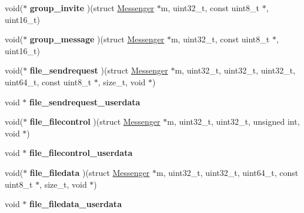 \begin{DoxyCompactItemize}
\item 
\hypertarget{struct_messenger_a60eaca4be38363ad7bc9d454fee814f4}{void($\ast$ {\bfseries group\+\_\+invite} )(struct \hyperlink{struct_messenger}{Messenger} $\ast$m, uint32\+\_\+t, const uint8\+\_\+t $\ast$, uint16\+\_\+t)}\label{struct_messenger_a60eaca4be38363ad7bc9d454fee814f4}

\item 
\hypertarget{struct_messenger_a41600d8061cac9e1ac8cef62bc690149}{void($\ast$ {\bfseries group\+\_\+message} )(struct \hyperlink{struct_messenger}{Messenger} $\ast$m, uint32\+\_\+t, const uint8\+\_\+t $\ast$, uint16\+\_\+t)}\label{struct_messenger_a41600d8061cac9e1ac8cef62bc690149}

\item 
\hypertarget{struct_messenger_a1d83804ee0bfe9249fda05cdd755a37f}{void($\ast$ {\bfseries file\+\_\+sendrequest} )(struct \hyperlink{struct_messenger}{Messenger} $\ast$m, uint32\+\_\+t, uint32\+\_\+t, uint32\+\_\+t, uint64\+\_\+t, const uint8\+\_\+t $\ast$, size\+\_\+t, void $\ast$)}\label{struct_messenger_a1d83804ee0bfe9249fda05cdd755a37f}

\item 
\hypertarget{struct_messenger_a26be37effc113183fae96f3a7279ebb0}{void $\ast$ {\bfseries file\+\_\+sendrequest\+\_\+userdata}}\label{struct_messenger_a26be37effc113183fae96f3a7279ebb0}

\item 
\hypertarget{struct_messenger_a1e3990148af844c986e09a946650f7f3}{void($\ast$ {\bfseries file\+\_\+filecontrol} )(struct \hyperlink{struct_messenger}{Messenger} $\ast$m, uint32\+\_\+t, uint32\+\_\+t, unsigned int, void $\ast$)}\label{struct_messenger_a1e3990148af844c986e09a946650f7f3}

\item 
\hypertarget{struct_messenger_a34ba46a8cf11b02a23f7a7d219608c3b}{void $\ast$ {\bfseries file\+\_\+filecontrol\+\_\+userdata}}\label{struct_messenger_a34ba46a8cf11b02a23f7a7d219608c3b}

\item 
\hypertarget{struct_messenger_a2f2875b7bf0dda7ed90908d4e1139493}{void($\ast$ {\bfseries file\+\_\+filedata} )(struct \hyperlink{struct_messenger}{Messenger} $\ast$m, uint32\+\_\+t, uint32\+\_\+t, uint64\+\_\+t, const uint8\+\_\+t $\ast$, size\+\_\+t, void $\ast$)}\label{struct_messenger_a2f2875b7bf0dda7ed90908d4e1139493}

\item 
\hypertarget{struct_messenger_a69c2b7ef494a50568b37c4ade72fdb62}{void $\ast$ {\bfseries file\+\_\+filedata\+\_\+userdata}}\label{struct_messenger_a69c2b7ef494a50568b37c4ade72fdb62}


\end{DoxyCompactItemize}
